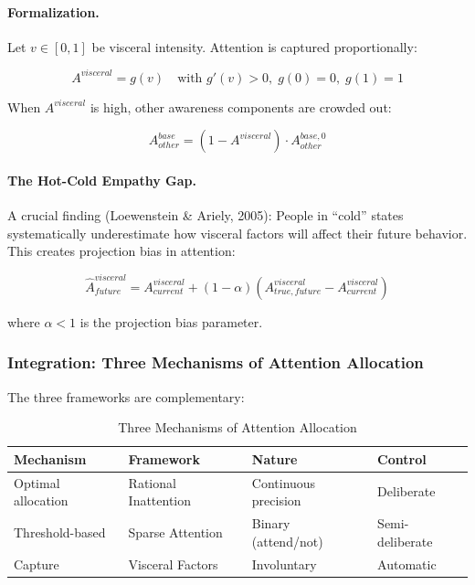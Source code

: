 \paragraph{Formalization.}
Let $v \in [0,1]$ be visceral intensity. Attention is captured proportionally:

\begin{equation}
A^{visceral} = g(v) \quad \text{with } g'(v) > 0, \; g(0) = 0, \; g(1) = 1
\end{equation}

When $A^{visceral}$ is high, other awareness components are crowded out:

\begin{equation}
A^{base}_{other} = (1 - A^{visceral}) \cdot A^{base,0}_{other}
\end{equation}

\paragraph{The Hot-Cold Empathy Gap.}
A crucial finding (Loewenstein \& Ariely, 2005): People in ``cold'' states 
systematically underestimate how visceral factors will affect their future 
behavior. This creates projection bias in attention:

\begin{equation}
\hat{A}^{visceral}_{future} = A^{visceral}_{current} + (1-\alpha)(A^{visceral}_{true,future} - A^{visceral}_{current})
\end{equation}

where $\alpha < 1$ is the projection bias parameter.

\subsubsection{Integration: Three Mechanisms of Attention Allocation}
\label{subsubsec:integration}

The three frameworks are complementary:

\begin{table}[htbp]
\centering
\caption{Three Mechanisms of Attention Allocation}
\label{tab:three-mechanisms}
\renewcommand{\arraystretch}{1.4}
\begin{tabular}{@{}llll@{}}
\toprule
\textbf{Mechanism} & \textbf{Framework} & \textbf{Nature} & \textbf{Control} \\
\midrule
Optimal allocation & Rational Inattention & Continuous precision & Deliberate \\
Threshold-based & Sparse Attention & Binary (attend/not) & Semi-deliberate \\
Capture & Visceral Factors & Involuntary & Automatic \\
\bottomrule
\end{tabular}
\end{table}

